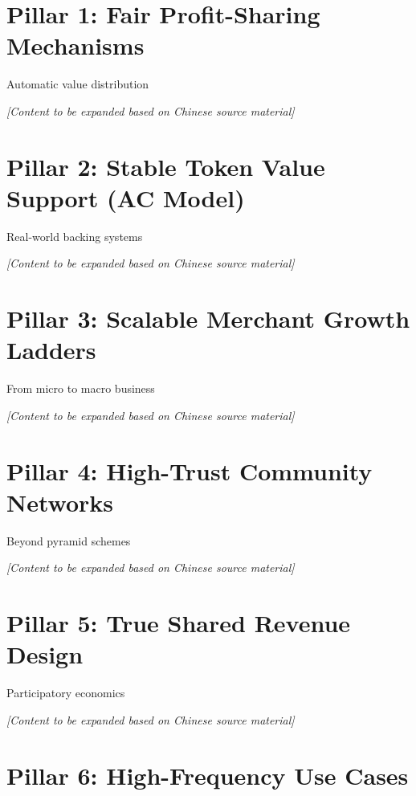 \documentclass[
  Letterpaper,
]{scrbook}
\begin{document}
\section{Pillar 1: Fair Profit-Sharing
Mechanisms}\label{pillar-1-fair-profit-sharing-mechanisms}

Automatic value distribution

\emph{{[}Content to be expanded based on Chinese source material{]}}

\section{Pillar 2: Stable Token Value Support (AC
Model)}\label{pillar-2-stable-token-value-support-ac-model}

Real-world backing systems

\emph{{[}Content to be expanded based on Chinese source material{]}}

\section{Pillar 3: Scalable Merchant Growth
Ladders}\label{pillar-3-scalable-merchant-growth-ladders}

From micro to macro business

\emph{{[}Content to be expanded based on Chinese source material{]}}

\section{Pillar 4: High-Trust Community
Networks}\label{pillar-4-high-trust-community-networks}

Beyond pyramid schemes

\emph{{[}Content to be expanded based on Chinese source material{]}}

\section{Pillar 5: True Shared Revenue
Design}\label{pillar-5-true-shared-revenue-design}

Participatory economics

\emph{{[}Content to be expanded based on Chinese source material{]}}

\section{Pillar 6: High-Frequency Use
Cases}\label{pillar-6-high-frequency-use-cases}
\end{document}
